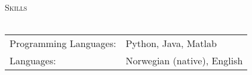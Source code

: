 \documentclass[a4paper]{article}
\newcommand{\lineunder} {
    \vspace*{-8pt} \\
    \hspace*{-18pt} \hrulefill \\
}
\newcommand{\header} [1] {
    {\hspace*{-18pt}\vspace*{6pt} \textsc{#1}}
    \vspace*{-6pt} \lineunder
}
\begin{document}
\header{Skills}
\begin{tabular}{ l l }
	Programming Languages: & Python, Java, Matlab                            \\
	Languages:             & Norwegian (native), English                                        \\
\end{tabular}
\vspace{2mm}
\end{document}
